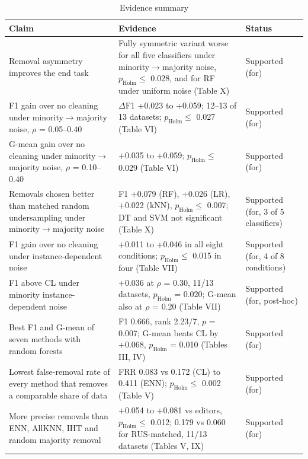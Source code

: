 \documentclass[conference]{IEEEtran}
\begin{document}
\begin{table}[!t]
\centering
\footnotesize
\caption{Evidence summary}
\label{tab:17}
\setlength{\tabcolsep}{3.5pt}
\begin{tabular}{>{\raggedright\arraybackslash}p{0.3939\dimexpr\linewidth-6\tabcolsep\relax}>{\raggedright\arraybackslash}p{0.4535\dimexpr\linewidth-6\tabcolsep\relax}>{\raggedright\arraybackslash}p{0.1526\dimexpr\linewidth-6\tabcolsep\relax}}
\hline
Claim & Evidence & Status \\
\hline
Removal asymmetry improves the end task & Fully symmetric variant worse for all five classifiers under minority$\rightarrow $majority noise, $p_{\mathrm{Holm}} \le $ 0.028, and for RF under uniform noise (Table X) & Supported (for) \\
F1 gain over no cleaning under minority$\rightarrow $majority noise, $\rho $ = 0.05--0.40 & $\Delta $F1 +0.023 to +0.059; 12--13 of 13 datasets; $p_{\mathrm{Holm}} \le $ 0.027 (Table VI) & Supported (for) \\
G-mean gain over no cleaning under minority$\rightarrow $majority noise, $\rho $ = 0.10--0.40 & +0.035 to +0.059; $p_{\mathrm{Holm}} \le $ 0.029 (Table VI) & Supported (for) \\
Removals chosen better than matched random undersampling under minority$\rightarrow $majority noise & F1 +0.079 (RF), +0.026 (LR), +0.022 (kNN), $p_{\mathrm{Holm}} \le $ 0.007; DT and SVM not significant (Table X) & Supported (for, 3 of 5 classifiers) \\
F1 gain over no cleaning under instance-dependent noise & +0.011 to +0.046 in all eight conditions; $p_{\mathrm{Holm}} \le $ 0.015 in four (Table VII) & Supported (for, 4 of 8 conditions) \\
F1 above CL under minority instance-dependent noise & +0.036 at $\rho $ = 0.30, 11/13 datasets, $p_{\mathrm{Holm}}$ = 0.020; G-mean also at $\rho $ = 0.20 (Table VII) & Supported (for, post-hoc) \\
Best F1 and G-mean of seven methods with random forests & F1 0.666, rank 2.23/7, $p$ = 0.007; G-mean beats CL by +0.068, $p_{\mathrm{Holm}}$ = 0.010 (Tables III, IV) & Supported (for) \\
Lowest false-removal rate of every method that removes a comparable share of data & FRR 0.083 vs 0.172 (CL) to 0.411 (ENN); $p_{\mathrm{Holm}} \le $ 0.002 (Table V) & Supported (for) \\
More precise removals than ENN, AllKNN, IHT and random majority removal & +0.054 to +0.081 vs editors, $p_{\mathrm{Holm}} \le $ 0.012; 0.179 vs 0.060 for RUS-matched, 11/13 datasets (Tables V, IX) & Supported (for) \\

\end{tabular}
\end{table}
\end{document}
